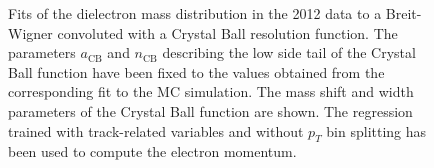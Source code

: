 \documentclass{cmspaper}
\begin{document}
\begin{figure}[h]
\centering
	\caption{Fits of the dielectron mass distribution in the 2012 data to
        a Breit-Wigner convoluted with a Crystal Ball resolution function. The parameters $a_{\mathrm{CB}}$ 
        and $n_{\mathrm{CB}}$ describing the low side tail of the Crystal Ball function have been fixed to the values
        obtained from the corresponding fit to the MC simulation. The mass shift and width parameters 
        of the Crystal Ball function are shown. The regression trained with track-related variables
        and without $p_{T}$ bin splitting has been used to compute the electron momentum.}
	\label{fig:ZMassFit_2012Data_Regression2}
\end{figure}

\clearpage
\end{document}
